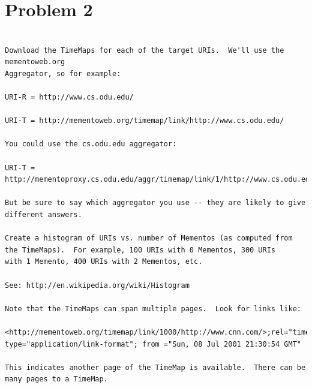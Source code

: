 

\section{Problem 2}
\label{part2}
\begin{verbatim}

Download the TimeMaps for each of the target URIs.  We'll use the mementoweb.org 
Aggregator, so for example:

URI-R = http://www.cs.odu.edu/

URI-T = http://mementoweb.org/timemap/link/http://www.cs.odu.edu/

You could use the cs.odu.edu aggregator:

URI-T = http://mementoproxy.cs.odu.edu/aggr/timemap/link/1/http://www.cs.odu.edu/

But be sure to say which aggregator you use -- they are likely to give
different answers.

Create a histogram of URIs vs. number of Mementos (as computed from
the TimeMaps).  For example, 100 URIs with 0 Mementos, 300 URIs
with 1 Memento, 400 URIs with 2 Mementos, etc.

See: http://en.wikipedia.org/wiki/Histogram

Note that the TimeMaps can span multiple pages.  Look for links like:

<http://mementoweb.org/timemap/link/1000/http://www.cnn.com/>;rel="timemap"; 
type="application/link-format"; from ="Sun, 08 Jul 2001 21:30:54 GMT"

This indicates another page of the TimeMap is available.  There can be 
many pages to a TimeMap.
\end{verbatim}

